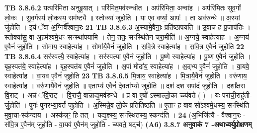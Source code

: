 \documentclass[17pt]{extarticle}
\begin{document}
{{{{{{{{{{{{{{{{{{{{{{                                \textbf{ TB 3.8.6.2} \newline
                  यत्परि॑मिता अनुब्रू॒यात् । परि॑मित॒मव॑रुन्धीत । अप॑रिमिता॒ अन्वा॑ह । अप॑रिमितः सुव॒र्गो लो॒कः । सु॒व॒र्गस्य॑ लो॒कस्य॒ सम॑ष्ट्यै ॥ स्तोक्या॑ जुहोति । या ए॒व वर्ष्या॒ आपः॑ । ता अव॑रुन्धे ॥ अ॒स्यां जु॑होति । इ॒यं ॅवा अ॒ग्निर्वै᳚श्वान॒रः \textbf{ 21} \newline
                  \newline
                                \textbf{ TB 3.8.6.3} \newline
                  अ॒स्यामे॒वैनाः॒ प्रति॑ष्ठापयति ॥ उ॒वाच॑ ह प्र॒जाप॑तिः । स्तोक्या॑सु॒ वा अ॒हम॑श्वमे॒धꣳ सꣳस्था॑पयामि । तेन॒ ततः॒ सꣳस्थि॑तेन चरा॒मीति॑ ॥ अ॒ग्नये॒ स्वाहेत्या॑ह । अ॒ग्नय॑ ए॒वैनं॑ जुहोति ॥ सोमा॑य॒ स्वाहेत्या॑ह । सोमा॑यै॒वैनं॑ जुहोति । स॒वि॒त्रे स्वाहेत्या॑ह । स॒वि॒त्र ए॒वैनं॑ जुहोति \textbf{ 22} \newline
                  \newline
                                \textbf{ TB 3.8.6.4} \newline
                  सर॑स्वत्यै॒ स्वाहेत्या॑ह । सर॑स्वत्या ए॒वैनं॑ जुहोति । पू॒ष्णे स्वाहेत्या॑ह । पू॒ष्ण ए॒वैनं॑ जुहोति । बृह॒स्पत॑ये॒ स्वाहेत्या॑ह । बृह॒स्पत॑य ए॒वैनं॑ जुहोति । अ॒पां मोदा॑य॒ स्वाहेत्या॑ह । अ॒द्भ्य ए॒वैनं॑ जुहोति । वा॒यवे॒ स्वाहेत्या॑ह । वा॒यव॑ ए॒वैनं॑ जुहोति \textbf{ 23} \newline
                  \newline
                                \textbf{ TB 3.8.6.5} \newline
                  मि॒त्राय॒ स्वाहेत्या॑ह । मि॒त्रायै॒वैनं॑ जुहोति । वरु॑णाय॒ स्वाहेत्या॑ह । वरु॑णायै॒वैनं॑ जुहोति ॥ ए॒ताभ्य॑ ए॒वैनं॑ दे॒वता᳚भ्यो जुहोति ॥ दश॑ दश स॒पांदं॑ जुहोति । दशा᳚क्षरा वि॒राट् । अन्नं॑ ॅवि॒राट् । वि॒राजै॒-वान्नाद्य॒मव॑रुन्धे ॥ प्र वा ए॒षो᳚-ऽस्माल्लो॒का-च्च्य॑वते ( ) । यः परा॑ची॒राहु॑ती-र्जु॒होति॑ । पुनः॑ पुनरभ्या॒वर्तं॑ जुहोति । अ॒स्मिन्ने॒व लो॒के प्रति॑तिष्ठति ॥ ए॒ताꣳ ह॒ वाव सो᳚ऽश्वमे॒धस्य॒ सꣳस्थि॑ति मुवा॒चा-स्क॑न्दाय । अस्क॑न्नꣳ॒॒ हि तत् । यद्य॒ज्ञ्स्य॒ सꣳस्थि॑तस्य॒ स्कन्द॑ति । \textbf{ 24} \newline
                  \newline
                                    (अ॒भिजि॑त्यै - वैश्वान॒रः - स॑वि॒त्र ए॒वैन॑म् जुहोति - वा॒यव॑ ए॒वैन॑म् जुहोति - च्यवते॒ षट्च॑) \textbf{(A6)} \newline \newline
                \textbf{ 3.8.7     अनुवाकं   7 -अथाध्वर्युप्रोक्षणम्} \newline
}}}}}}}}}}}}}}}}}}}}}}
\end{document}
